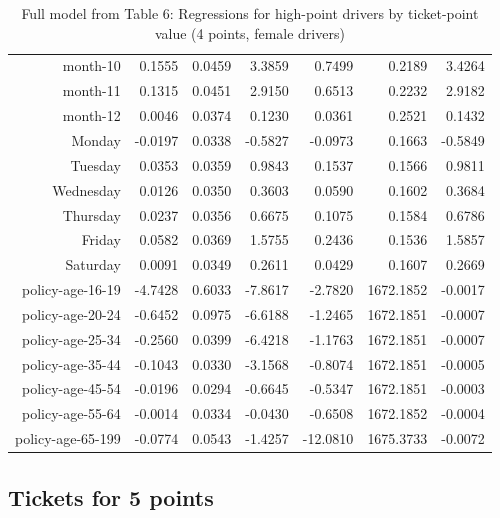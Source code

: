 \documentclass[10pt]{article}
\begin{document}
\begin{table}[ht]
\begin{tabular}{rrrrrrr}
  month-10 & 0.1555 & 0.0459 & 3.3859 & 0.7499 & 0.2189 & 3.4264 \\ 
  month-11 & 0.1315 & 0.0451 & 2.9150 & 0.6513 & 0.2232 & 2.9182 \\ 
  month-12 & 0.0046 & 0.0374 & 0.1230 & 0.0361 & 0.2521 & 0.1432 \\ 
  Monday & -0.0197 & 0.0338 & -0.5827 & -0.0973 & 0.1663 & -0.5849 \\ 
  Tuesday & 0.0353 & 0.0359 & 0.9843 & 0.1537 & 0.1566 & 0.9811 \\ 
  Wednesday & 0.0126 & 0.0350 & 0.3603 & 0.0590 & 0.1602 & 0.3684 \\ 
  Thursday & 0.0237 & 0.0356 & 0.6675 & 0.1075 & 0.1584 & 0.6786 \\ 
  Friday & 0.0582 & 0.0369 & 1.5755 & 0.2436 & 0.1536 & 1.5857 \\ 
  Saturday & 0.0091 & 0.0349 & 0.2611 & 0.0429 & 0.1607 & 0.2669 \\ 
  policy-age-16-19 & -4.7428 & 0.6033 & -7.8617 & -2.7820 & 1672.1852 & -0.0017 \\ 
  policy-age-20-24 & -0.6452 & 0.0975 & -6.6188 & -1.2465 & 1672.1851 & -0.0007 \\ 
  policy-age-25-34 & -0.2560 & 0.0399 & -6.4218 & -1.1763 & 1672.1851 & -0.0007 \\ 
  policy-age-35-44 & -0.1043 & 0.0330 & -3.1568 & -0.8074 & 1672.1851 & -0.0005 \\ 
  policy-age-45-54 & -0.0196 & 0.0294 & -0.6645 & -0.5347 & 1672.1851 & -0.0003 \\ 
  policy-age-55-64 & -0.0014 & 0.0334 & -0.0430 & -0.6508 & 1672.1852 & -0.0004 \\ 
  policy-age-65-199 & -0.0774 & 0.0543 & -1.4257 & -12.0810 & 1675.3733 & -0.0072 \\ 
   \hline
\end{tabular}
\caption{Full model from Table 6: Regressions for high-point drivers by ticket-point value (4 points, female drivers)} 
\label{tab_6_4_pts_F}
\end{table}


\clearpage
\pagebreak




\subsection*{Tickets for 5 points}
\end{document}
